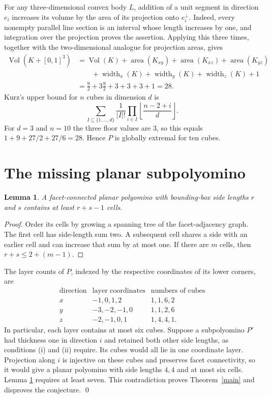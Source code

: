 \documentclass[11pt]{article}
\newtheorem{lemma}{Lemma}
\newcommand{\Vol}{\operatorname{Vol}}
\begin{document}
For any three-dimensional convex body $L$, addition of a unit segment
in direction $e_i$ increases its volume by the area of its projection
onto $e_i^\perp$. Indeed, every nonempty parallel line section is an
interval whose length increases by one, and integration over the
projection proves the assertion. Applying this three times, together
with the two-dimensional analogue for projection areas, gives
\begin{align*}
\Vol(K+[0,1]^3)
 &=\Vol(K)+\operatorname{area}(K_{xy})
   +\operatorname{area}(K_{xz})+\operatorname{area}(K_{yz})\\
 &\qquad+\operatorname{width}_x(K)+\operatorname{width}_y(K)
   +\operatorname{width}_z(K)+1\\
 &=\frac92+3\frac92+3+3+3+1=28.
\end{align*}
Kurz's upper bound \cite[Theorem 4]{Kurz} for $n$ cubes in dimension $d$
is
\[
\sum_{I\subseteq\{1,\ldots,d\}}\frac1{|I|!}
  \prod_{i\in I}\left\lfloor\frac{n-2+i}{d}\right\rfloor.
\]
For $d=3$ and $n=10$ the three floor values are $3$, so this equals
$1+9+27/2+27/6=28$. Hence $P$ is globally extremal for ten cubes.

\section*{The missing planar subpolyomino}
\begin{lemma}\label{planar}
A facet-connected planar polyomino with bounding-box side lengths
$r$ and $s$ contains at least $r+s-1$ cells.
\end{lemma}
\begin{proof}
Order its cells by growing a spanning tree of the facet-adjacency graph.
The first cell has side-length sum two. A subsequent cell shares a side
with an earlier cell and can increase that sum by at most one. If there
are $m$ cells, then $r+s\le 2+(m-1)$.
\end{proof}
The layer counts of $P$, indexed by the respective coordinates of its
lower corners, are
\[
\begin{array}{c|c|c}
\text{direction}&\text{layer coordinates}&\text{numbers of cubes}\\\hline
x&-1,0,1,2&1,1,6,2\\
y&-3,-2,-1,0&1,1,2,6\\
z&-2,-1,0,1&1,4,4,1.
\end{array}
\]
In particular, each layer contains at most six cubes. Suppose a
subpolyomino $P'$ had thickness one in direction $i$ and retained both
other side lengths, as conditions (i) and (ii) require. Its cubes would
all lie in one coordinate layer. Projection along $i$ is injective on
these cubes and preserves facet connectivity, so it would give a planar
polyomino with side lengths $4,4$ and at most six cells. Lemma
\ref{planar} requires at least seven. This contradiction proves
Theorem~\ref{main} and disproves the conjecture. \qed
\end{document}
